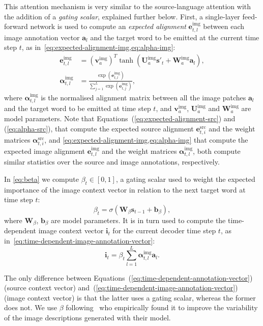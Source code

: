 \documentclass[11pt]{article}
\begin{document}
This attention mechanism is very similar to the source-language attention with the addition of a \textit{gating scalar}, explained further below.
First, a single-layer feed-forward network is used to compute an \emph{expected alignment} $\bm{e}^\text{img}_{t,l}$ between each image annotation vector $\bm{a}_l$ and the target word to be emitted at the current time step $t$, as in~\cref{eq:expected-alignment-img,eq:alpha-img}:
\begin{align}
\bm{e}^\text{img}_{t,l} &= (\bm{v}^\text{img}_a)^T \tanh( \bm{U}^\text{img}_a \bm{s}'_t + \bm{W}^\text{img}_a \bm{a}_l),\label{eq:expected-alignment-img}\\
\bm{\alpha}^\text{img}_{t,l} &= \frac{\exp{(\bm{e}^\text{img}_{t,l})}}{ \sum_{j=1}^{L}{\exp{(\bm{e}^\text{img}_{t,j})}}\label{eq:alpha-img} },
\end{align}
\noindent
where $\bm{\alpha}^\text{img}_{t,l}$ is the normalised alignment matrix between all the image patches $\bm{a}_l$ and the target word to be emitted at time step $t$, and $\bm{v}^\text{img}_a$, $\bm{U}^\text{img}_a$ and $\bm{W}^\text{img}_a$ are model parameters.
Note that Equations~(\ref{eq:expected-alignment-src}) and (\ref{eq:alpha-src}), that compute the expected source alignment $\bm{e}^\text{src}_{t,i}$ and the weight matrices $\bm{\alpha}^\text{src}_{t,i}$, and \cref{eq:expected-alignment-img,eq:alpha-img} that compute the expected image alignment $\bm{e}^\text{img}_{t,l}$ and the weight matrices $\bm{\alpha}^\text{img}_{t,l}$, both compute similar statistics over the source and image annotations, respectively.


In \cref{eq:beta} we compute $\beta_t \in [0,1]$, a gating scalar used to weight the expected importance of the image context vector in relation to the next target word at time step $t$:
\begin{equation}\label{eq:beta}
  \beta_t = \sigma( \bm{W}_{\beta} \bm{s}_{t-1} + \bm{b}_{\beta}),
\end{equation}
\noindent
where $\bm{W}_{\beta}$, $\bm{b}_{\beta}$ are model parameters.
It is in turn used to compute the time-dependent image context vector $\bm{i}_t$ for the current decoder time step $t$, as in~\cref{eq:time-dependent-image-annotation-vector}:
\begin{equation}\label{eq:time-dependent-image-annotation-vector}
  \bm{i}_t = \beta_t \sum_{l=1}^{L}{ \bm{\alpha}^\text{img}_{t,l} \bm{a}_l }.
\end{equation}

The only difference between Equations~(\ref{eq:time-dependent-annotation-vector}) (source context vector) and~(\ref{eq:time-dependent-image-annotation-vector}) (image context vector) is that the latter uses a gating scalar, whereas the former does not.
We use $\beta$ following~ who empirically found it to improve the variability of the image descriptions generated with their model.
\end{document}
